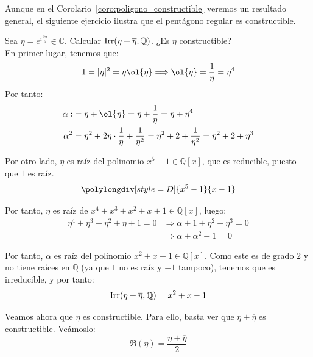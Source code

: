 Aunque en el Corolario~\ref{coro:poligono_constructible} veremos un resultado general, el siguiente ejercicio ilustra que el pentágono regular es constructible.
\begin{ejercicio}
    Sea $\eta = e^{i\frac{2\pi}{5}}\in \mathbb{C}$. Calcular $\operatorname{Irr}(\eta+\overline{\eta},\mathbb{Q})$. ¿Es $\eta$ constructible?\\

    En primer lugar, tenemos que:
    \begin{equation*}
        1 = |\eta|^2 = \eta\ol{\eta}\Longrightarrow \ol{\eta} = \frac{1}{\eta} = \eta^4
    \end{equation*}
    Por tanto:
    \begin{align*}
        \alpha :&= \eta + \ol{\eta} = \eta + \frac{1}{\eta} = \eta + \eta^4\\
        \alpha^2 &= \eta^2 + 2\eta\cdot \frac{1}{\eta} + \frac{1}{\eta^2} = \eta^2 + 2 + \frac{1}{\eta^2} = \eta^2 + 2 + \eta^3
    \end{align*}

    Por otro lado, $\eta$ es raíz del polinomio $x^5-1\in \mathbb{Q}[x]$, que es reducible, puesto que $1$ es raíz.
    \begin{equation*}
        \polylongdiv[style=D]{x^5-1}{x-1}
    \end{equation*}

    Por tanto, $\eta$ es raíz de $x^4+x^3+x^2+x+1\in \mathbb{Q}[x]$, luego:
    \begin{align*}
        \eta^4 + \eta^3 + \eta^2 + \eta + 1 = 0 &\Longrightarrow \alpha + 1 + \eta^2 + \eta^3 = 0\\
        &\Longrightarrow \alpha + \alpha^2 - 1 = 0
    \end{align*}

    Por tanto, $\alpha$ es raíz del polinomio $x^2+x-1\in \mathbb{Q}[x]$. Como este es de grado $2$ y no tiene raíces en $\mathbb{Q}$ (ya que $1$ no es raíz y $-1$ tampoco), tenemos que es irreducible, y por tanto:
    \begin{equation*}
        \operatorname{Irr}(\eta+\overline{\eta},\mathbb{Q}) = x^2+x-1
    \end{equation*}

    Veamos ahora que $\eta$ es constructible. Para ello, basta ver que $\eta+\overline{\eta}$ es constructible. Veámoslo:
    \begin{equation*}
        \Re(\eta) = \frac{\eta+\overline{\eta}}{2}
    \end{equation*}


\end{ejercicio}
